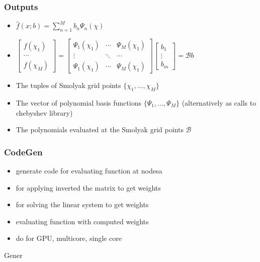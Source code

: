 \documentclass{beamer}
\begin{document}
\begin{frame}
  \frametitle{Outputs}
  \begin{itemize}
  \item $\hat{f}(x;b)=\sum_{n=1}^M b_n \Psi_n(\chi)$
  \item $
    \begin{bmatrix}
      f(\chi_1)\\ \cdots \\       f(\chi_M)
    \end{bmatrix}=
      \begin{bmatrix}
        \Psi_1(\chi_1) &\cdots &        \Psi_M(\chi_1)\\
\vdots&\ddots&\cdots\\
        \Psi_1(\chi_1)& \cdots   &      \Psi_M(\chi_1)
      \end{bmatrix}
      \begin{bmatrix}
        b_1\\ \vdots \\ b_m
      \end{bmatrix}= \mathcal{B} b
$
  \item The tuples of Smolyak grid points $\{\chi_1, \ldots , \chi_M\}$
  \item The vector of polynomial basis functions $\{\Psi_1, \ldots , \Psi_M\}$ (alternatively as calls to chebyshev library)
  \item The polynomials evaluated at the Smolyak grid points $\mathcal{B}$
  \end{itemize}
\end{frame}
\begin{frame}
  \frametitle{CodeGen}
  \begin{itemize}
  \item generate code for evaluating function at nodesa
  \item for applying inverted the matrix to get weights 
  \item for solving the linear system to get weights
  \item evaluating function with computed weights
  \item do for GPU, multicore, single core
  \end{itemize}
  Gener
\end{frame}
\end{document}
